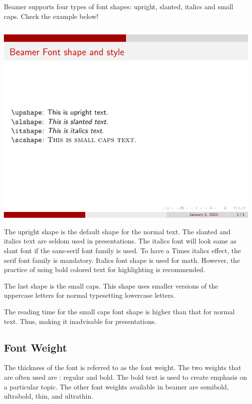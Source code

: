 Beamer supports four types of font shapes: upright, slanted, italics and small caps. Check the example below!

\inputminted[linenos=true]{latex}{examples/beamer/font-shape.tex}

\includegraphics{examples/beamer/font-shape.pdf}

The upright shape is the default shape for the normal text. The slanted and italics text are seldom used in presentations. The italics font will look same as slant font if the sans-serif font family is used. To have a Times italics effect, the serif font family is mandatory. Italics font shape is used for math. However, the practice of using bold colored text for highlighting is recommended.

The last shape is the small caps. This shape uses smaller versions of the uppercase letters for normal typesetting lowercase letters.

The reading time for the small caps font shape is higher than that for normal text. Thus, making it inadvisable for presentations.

\subsection{Font Weight}

The thickness of the font is referred to as the font weight. The two weights
that are often used are : regular and bold. The bold text is used to create emphasis on a particular topic. The other font weights available in beamer are semibold, ultrabold, thin, and ultrathin.

